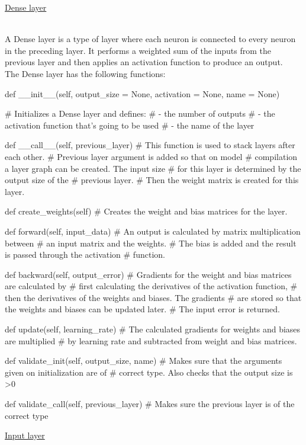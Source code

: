 \documentclass{article}
\begin{document}
    \hypertarget{dense_layer}{\underline{Dense layer}} \\

    A Dense layer is a type of layer where each neuron is connected to every neuron 
    in the preceding layer. It performs a weighted sum of the inputs from the previous
    layer and then applies an activation function to produce an output. \\

    The Dense layer has the following functions:
\begin{python}
def __init__(self,
             output_size = None,
             activation  = None,
             name        = None)

# Initializes a Dense layer and defines:
#       - the number of outputs
#       - the activation function that's going to be used
#       - the name of the layer
\end{python}
\begin{python}
def __call__(self,
             previous_layer)
# This function is used to stack layers after each other.
# Previous layer argument is added so that on model 
# compilation a layer graph can be created. The input size 
# for this layer is determined by the output size of the 
# previous layer.
# Then the weight matrix is created for this layer.
\end{python}
\begin{python}
def create_weights(self)
# Creates the weight and bias matrices for the layer.
\end{python}
\begin{python}
def forward(self,
            input_data)
# An output is calculated by matrix multiplication between
# an input matrix  and the weights.
# The bias is added and the result is passed through the activation 
# function.
\end{python}
\begin{python}
def backward(self,
             output_error)
# Gradients for the weight and bias matrices are calculated by
# first calculating the derivatives of the activation function,
# then the derivatives of the weights and biases. The gradients 
# are stored so that the weights and biases can be updated later.
# The input error is returned.
\end{python}
\begin{python}
def update(self,
           learning_rate)
# The calculated gradients for weights and biases are multiplied
# by learning rate and subtracted from weight and bias matrices.
\end{python}
\pagebreak
\begin{python}
def validate_init(self,
                  output_size,
                  name)
# Makes sure that the arguments given on initialization are of 
# correct type. Also checks that the output size is >0
\end{python}
\begin{python}
def validate_call(self,
                  previous_layer)
# Makes sure the previous layer is of the correct type                
\end{python}
\clearpage
\hypertarget{input_layer}{\underline{Input layer}} \\
\end{document}
